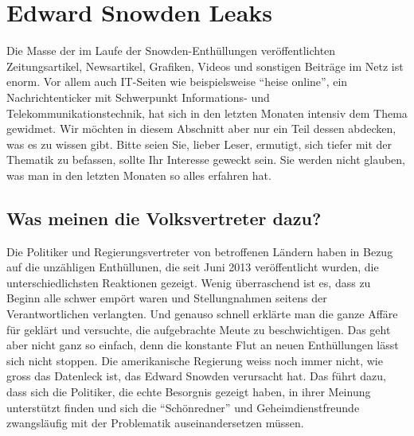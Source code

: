 \newpage
\section{Edward Snowden Leaks}
Die Masse der im Laufe der Snowden-Enthüllungen veröffentlichten Zeitungsartikel, Newsartikel, Grafiken, Videos und sonstigen Beiträge im Netz ist enorm. Vor allem auch IT-Seiten wie beispielsweise ``heise online'', ein Nachrichtenticker mit Schwerpunkt Informations- und Telekommunikationstechnik, hat sich in den letzten Monaten intensiv dem Thema gewidmet. Wir möchten in diesem Abschnitt aber nur ein Teil dessen abdecken, was es zu wissen gibt. Bitte seien Sie, lieber Leser, ermutigt, sich tiefer mit der Thematik zu befassen, sollte Ihr Interesse geweckt sein. Sie werden nicht glauben, was man in den letzten Monaten so alles erfahren hat.  

\subsection{Was meinen die Volksvertreter dazu?}
Die Politiker und Regierungsvertreter von betroffenen Ländern haben in Bezug auf die unzähligen Enthüllunen, die seit Juni 2013 veröffentlicht wurden, die unterschiedlichsten Reaktionen gezeigt. Wenig überraschend ist es, dass zu Beginn alle schwer empört waren und Stellungnahmen seitens der Verantwortlichen verlangten. Und genauso schnell erklärte man die ganze Affäre für geklärt und versuchte, die aufgebrachte Meute zu beschwichtigen. Das geht aber nicht ganz so einfach, denn die konstante Flut an neuen Enthüllungen lässt sich nicht stoppen. Die amerikanische Regierung weiss noch immer nicht, wie gross das Datenleck ist, das Edward Snowden verursacht hat. Das führt dazu, dass sich die Politiker, die echte Besorgnis gezeigt haben, in ihrer Meinung unterstützt finden und sich die ``Schönredner'' und Geheimdienstfreunde zwangsläufig mit der Problematik auseinandersetzen müssen.
\\ 
\\


